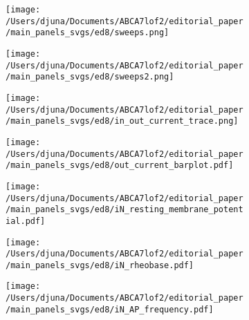 \documentclass[12pt]{article}
\begin{document}
\begin{figure}[H]
    \begin{subfigure}[t]{0.33\textwidth}
        \caption{}
        \texttt{[image: /Users/djuna/Documents/ABCA7lof2/editorial\_paper/main\_panels\_svgs/ed8/sweeps.png]}        
    \end{subfigure}   
    \begin{subfigure}[t]{0.2\textwidth}
        \caption{}
        \texttt{[image: /Users/djuna/Documents/ABCA7lof2/editorial\_paper/main\_panels\_svgs/ed8/sweeps2.png]}        
    \end{subfigure}   
    \begin{subfigure}[t]{0.33\textwidth}
        \caption{}
        \texttt{[image: /Users/djuna/Documents/ABCA7lof2/editorial\_paper/main\_panels\_svgs/ed8/in\_out\_current\_trace.png]}        
    \end{subfigure}  
    \begin{subfigure}[t]{0.33\textwidth}
        \caption{}
        \texttt{[image: /Users/djuna/Documents/ABCA7lof2/editorial\_paper/main\_panels\_svgs/ed8/out\_current\_barplot.pdf]}        
    \end{subfigure}  
    \begin{subfigure}[t]{0.25\textwidth}
        \caption{}
        \texttt{[image: /Users/djuna/Documents/ABCA7lof2/editorial\_paper/main\_panels\_svgs/ed8/iN\_resting\_membrane\_potential.pdf]}        
    \end{subfigure}  
    \begin{subfigure}[t]{0.25\textwidth}
        \caption{}
        \texttt{[image: /Users/djuna/Documents/ABCA7lof2/editorial\_paper/main\_panels\_svgs/ed8/iN\_rheobase.pdf]}        
    \end{subfigure} 
    \hspace{1cm}
    \begin{subfigure}[t]{0.4\textwidth}
        \caption{}
        \texttt{[image: /Users/djuna/Documents/ABCA7lof2/editorial\_paper/main\_panels\_svgs/ed8/iN\_AP\_frequency.pdf]}        
    \end{subfigure}  
\end{figure}
\end{document}
